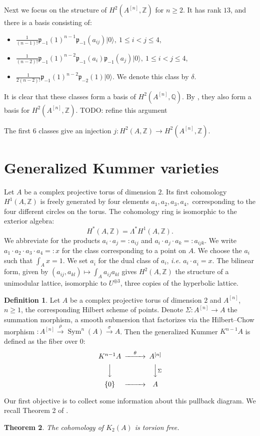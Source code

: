 \documentclass{amsart}
\DeclareMathOperator{\Sym}{Sym}
\newcommand{\hilb}[1]{^{[#1]}}
\newcommand{\ie}{{\it i.e. }}
\newcommand{\vac}{|0\rangle}
\newcommand{\p}{\mathfrak{p}}
\newcommand{\Q}{\mathbb{Q}}
\newcommand{\Z}{\mathbb{Z}}
\theoremstyle{plain}
\newtheorem{theorem}{Theorem}[section]
\theoremstyle{definition}
\newtheorem{definition}[theorem]{Definition}
\theoremstyle{remark}
\begin{document}
Next we focus on the structure of $H^2(A\hilb{n},\Z)$ for $n\geq 2$. It has rank $13$, and there is a basis consisting of:
\begin{itemize}
 \item $\frac{1}{(n-1)!}\p_{-1}(1)^{n-1}\p_{-1}(a_{ij})\vac,\ 1\leq i < j\leq 4$,
 \item $\frac{1}{(n-2)!}\p_{-1}(1)^{n-2}\p_{-1}(a_{i})\p_{-1}(a_{j})\vac,\ 1\leq i < j\leq 4$,
 \item $\frac{1}{2(n-2)!}\p_{-1}(1)^{n-2}\p_{-2}(1) \vac$. We denote this class by $\delta$.
\end{itemize}
It is clear that these classes form a basis of $H^2(A\hilb{n},\Q)$. By \cite[Thm.~4.6,Lemma~5.2]{QinWang}, they also form a basis for $H^2(A\hilb{n},\Z)$. TODO: refine this argument

The first $6$ classes give an injection $j : H^2(A,\Z)\rightarrow H^2(A\hilb{n},\Z)$. 

\section{Generalized Kummer varieties}
Let $A$ be a complex projective torus of dimension $2$. Its first cohomology $H^1(A,\Z)$ is freely generated by four elements $a_1,a_2,a_3,a_4,$ corresponding to the four different circles on the torus. The cohomology ring is isomorphic to the exterior algebra:
$$
H^*(A,\Z) = \Lambda^* H^1(A,\Z).
$$
We abbreviate for the products $a_i\cdot a_j =: a_{ij}$ and $a_i\cdot a_j\cdot a_k =: a_{ijk}$. We write $a_1\cdot a_2\cdot a_3 \cdot a_4 =:x$ for the class corresponding to a point on $A$. We choose the $a_i$ such that $\int_A x = 1$. We set $a_{\overline{i}}$ for the dual class of $a_i$, \ie  $a_i\cdot a_{\overline{i}} =x$.
The bilinear form, given by $(a_{ij},a_{kl})\mapsto\int_A a_{ij}a_{kl}$ gives $H^2(A,\Z)$ the structure of a unimodular lattice, isomorphic to $U^{\oplus 3}$, three copies of the hyperbolic lattice. 

\begin{definition}
Let $A$ be a complex projective torus of dimension $2$ and $A\hilb{n}$, $n\geq 1$, the corresponding Hilbert scheme of points. Denote $\Sigma : A\hilb{n} \rightarrow A$ the summation morphism, a smooth submersion that factorizes via the Hilbert--Chow morphism $: A\hilb{n}\stackrel{\rho}{\rightarrow}\Sym^n(A)\stackrel{\sigma}{\rightarrow} A$. Then the generalized Kummer $K^{n-1} A $ is defined as the fiber over $0$:
\begin{equation}\label{square}
\begin{CD}
K^{n-1}A @>\theta >> A\hilb{n}\\
@VVV @VV\Sigma V\\
\{0\} @> >> A
\end{CD}
\end{equation}
\end{definition}
Our first objective is to collect some information about this pullback diagram. 
We recall Theorem 2 of \cite{Spanier}.
\begin{theorem}\label{torsion}
The cohomology of $K_{2}(A)$ is torsion free. 
\end{theorem}
\end{document}
